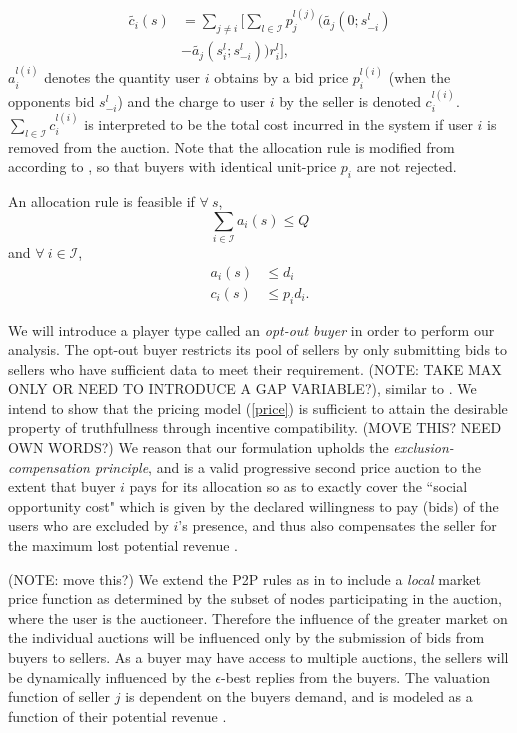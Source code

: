 \documentclass[12pt]{article}
\theoremstyle{definition}
\newcommand{\mcI}{\mathcal{I}}
\begin{document}
\begin{multicols}{2}
\begin{align*}
    \tilde{c_i}(s) &= \displaystyle\sum_{j\ne i}\bigg\lbrack\sum_{l\in\mcI}
p_j^{l(j)} \bigg(\tilde{a_j}(0; s_{-i}^l)\\
    &-\tilde{a_j}(s_i^l;s_{-i}^l)\bigg) r_i^l\bigg\rbrack,
\end{align*}
 $a_i^{l(i)}$ denotes the quantity user $i$ obtains by a bid price
$p_i^{l(i)}$ (when the
opponents bid $s_{−i}^l$) and the charge to user $i$ by the seller is denoted
$c_i^{l(i)}$. $\sum_{l\in\mcI} c_i^{l(i)}$ is interpreted to be the total cost incurred in the system if
user $i$ is removed from the auction. Note that the allocation rule is modified
from \cite{lazar} according to \cite{tuffin}, so that buyers with identical unit-price
$p_i$ are not rejected.

An allocation rule is feasible \cite{lazar} if $\forall \ s$,
$$
    \displaystyle\sum_{i\in\mcI} a_i(s) \le Q
$$
and $\forall \ i\in\mcI$,
\begin{align*}
    a_i(s) &\le d_i \\
    c_i(s) &\le p_id_i.
\end{align*}

We will introduce a player type called an \emph{opt-out buyer} in order to perform our analysis. The
opt-out buyer restricts its pool of sellers by only submitting bids to sellers
who have sufficient data to meet their requirement.
(NOTE: TAKE MAX ONLY OR NEED TO INTRODUCE
A GAP VARIABLE?), similar to \cite{zheng}. 
We intend to show that the pricing model (\ref{price}) is sufficient to attain the desirable
property of truthfullness through incentive compatibility. (MOVE THIS? NEED OWN
WORDS?) We
reason that our formulation upholds the \emph{exclusion-compensation
principle}, and is a valid progressive second price auction to the extent that buyer $i$
pays for its allocation so as to exactly cover the ``social opportunity cost" which is given by the declared willingness to pay (bids) of the users who are excluded by $i$'s
presence, and thus also compensates the seller for the maximum lost potential
revenue \cite{lazar}.

(NOTE: move this?)
We extend the P2P rules as in \cite{semret} to include a \emph{local} market
price function as determined by the subset of nodes participating in the
auction, where the user is the auctioneer. Therefore the influence of the greater market on the individual
auctions will be influenced only by the submission of bids from buyers to
sellers. As a buyer may have access to multiple auctions, the sellers will be
dynamically influenced by the $\epsilon$-best replies from the buyers. The
valuation function of seller $j$ is dependent on the buyers demand, and is
modeled as a function of their potential revenue \cite{semret}. 


\end{multicols}
\end{document}
